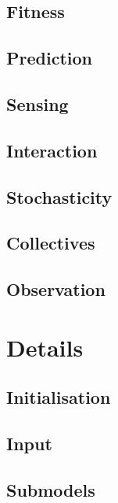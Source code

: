 \documentclass{article}
\begin{document}
\subsection{Fitness}



\subsection{Prediction}



\subsection{Sensing}



\subsection{Interaction}



\subsection{Stochasticity}



\subsection{Collectives}



\subsection{Observation}




\section{Details}



\subsection{Initialisation}



\subsection{Input}



\subsection{Submodels}
\end{document}
